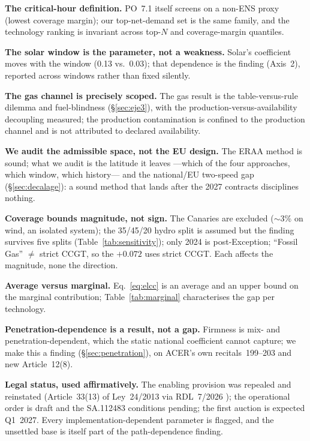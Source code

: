 \documentclass[11pt,a4paper]{article}
\begin{document}
\textbf{The critical-hour definition.} PO~7.1 itself screens on a non-ENS proxy
(lowest coverage margin); our top-net-demand set is the same family, and the technology
ranking is invariant across top-$N$ and coverage-margin quantiles.

\textbf{The solar window is the parameter, not a weakness.} Solar's coefficient moves
with the window (0.13 vs.\ 0.03); that dependence is the finding (Axis~2), reported
across windows rather than fixed silently.

\textbf{The gas channel is precisely scoped.} The gas result is the table-versus-rule
dilemma and fuel-blindness (\S\ref{sec:eje3}), with the production-versus-availability
decoupling measured; the production contamination is confined to the production channel
and is not attributed to declared availability.

\textbf{We audit the admissible space, not the EU design.} The ERAA method is sound;
what we audit is the latitude it leaves ---which of the four approaches, which window,
which history--- and the national/EU two-speed gap (\S\ref{sec:decalage}): a sound
method that lands after the 2027 contracts disciplines nothing.

\textbf{Coverage bounds magnitude, not sign.} The Canaries are excluded ($\sim$3\%
on wind, an isolated system); the 35/45/20 hydro split is assumed but the finding
survives five splits (Table~\ref{tab:sensitivity}); only 2024 is post-Exception;
``Fossil Gas'' $\ne$ strict CCGT, so the $+0.072$ uses strict CCGT. Each affects the
magnitude, none the direction.

\textbf{Average versus marginal.} Eq.~\ref{eq:elcc} is an average and an upper bound on
the marginal contribution; Table~\ref{tab:marginal} characterises the gap per
technology.

\textbf{Penetration-dependence is a result, not a gap.} Firmness is mix- and
penetration-dependent, which the static national coefficient cannot capture; we make
this a finding (\S\ref{sec:penetration}), on ACER's own recitals~199--203 and new
Article~12(8).

\textbf{Legal status, used affirmatively.} The enabling provision was repealed and
reinstated (Article~33(13) of Ley~24/2013 via RDL~7/2026 \citep{rdl72026}); the
operational order is draft and the SA.112483 conditions pending; the first auction is
expected Q1~2027. Every implementation-dependent parameter is flagged, and the
unsettled base is itself part of the path-dependence finding.

\end{document}
